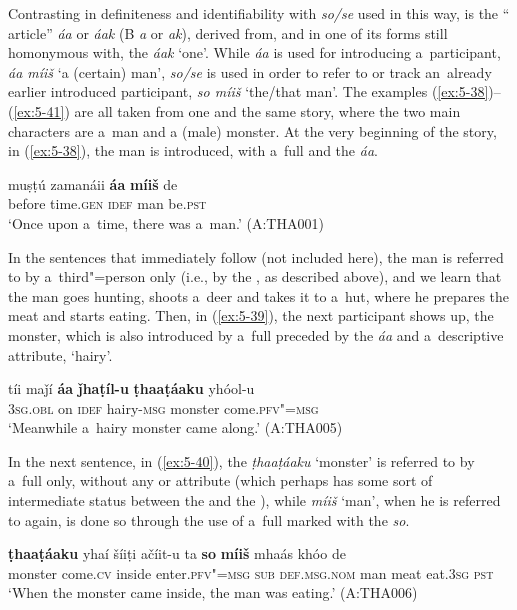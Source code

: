 Contrasting in definiteness and identifiability with \textit{so/se} used in this way, is the `` article'' \textit{áa} or \textit{áak} (B \textit{a} or \textit{ak}), derived from, and in one of its forms still homonymous with, the  \textit{áak} `one'. While \textit{áa} is used for introducing a~participant, \textit{áa míiš} `a (certain) man', \textit{so/se} is used in order to refer to or track an~already earlier introduced participant, \textit{so míiš} `the/that man'. The examples (\ref{ex:5-38})--(\ref{ex:5-41}) are all taken from one and the same story, where the two main characters are a~man and a (male) monster. At the very beginning of the story, in (\ref{ex:5-38}), the man is introduced, with a~full  and the  \textit{áa}.

\begin{exe}
\ex
\label{ex:5-38}
\gll muṣṭú zamanáii \textbf{áa} \textbf{míiš} de\\
before time.\textsc{gen} \textsc{idef} man be.\textsc{pst}\\
\glt `Once upon a~time, there was a~man.' (A:THA001)
\end{exe}

In the sentences that immediately follow (not included here), the man is referred to by
a~third"=person  only (i.e., by the  , as described above), and we learn
that the man goes hunting, shoots a~deer and takes it to a~hut, where he prepares the meat and
starts eating. Then, in (\ref{ex:5-39}), the next participant shows up, the monster, which is also
introduced by a~full  preceded by the  \textit{áa} and a~descriptive attribute,
`hairy'.
\begin{exe}
\ex
\label{ex:5-39}
\gll tíi maǰí \textbf{áa} \textbf{ǰhaṭíl-u} \textbf{ṭhaaṭáaku} yhóol-u\\
\textsc{3sg.obl} on \textsc{idef} hairy-\textsc{msg} monster come.\textsc{pfv"=msg}\\
\glt `Meanwhile a~hairy monster came along.' (A:THA005)
\end{exe}

In the next sentence, in (\ref{ex:5-40}), the \textit{ṭhaaṭáaku} `monster' is referred to by a~full 
only, without any  or attribute (which perhaps has some sort of intermediate status
between the  and the ), while \textit{míiš} `man', when he is referred to
again, is done so through the use of a~full  marked with the  \textit{so}.
\begin{exe}
\ex
\label{ex:5-40}
\gll \textbf{ṭhaaṭáaku} yhaí šíiṭi ačíit-u ta \textbf{so} \textbf{míiš} mhaás khóo de\\
monster come.\textsc{cv} inside enter.\textsc{pfv"=msg} \textsc{sub} \textsc{def.msg.nom} man meat eat.\textsc{3sg} \textsc{pst}\\
\glt `When the monster came inside, the man was eating.' (A:THA006)
\end{exe}

